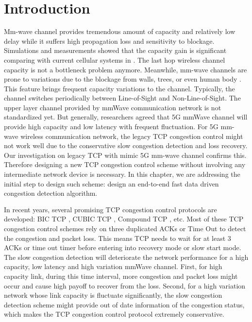 \section{Introduction}
\par  Mm-wave channel provides tremendous amount of capacity and relatively low delay while it suffers high propagation loss and sensitivity to blockage. Simulations and measurements showed that the capacity gain is significant comparing with current cellular systems in \cite{akdeniz2014millimeter,bai2015coverage}. The last hop wireless channel capacity is not a bottleneck problem anymore. Meanwhile, mm-wave channels are prone to variations due to the blockage from walls, trees, or even human body \cite{lu2012modeling, zhao201328, alejos2008measurement}. This feature brings frequent capacity variations to the channel. Typically, the channel switches periodically between Line-of-Sight and Non-Line-of-Sight. The upper layer channel provided by mmWave communication network is not standardized yet. But generally, researchers agreed that 5G mmWave channel will provide high capacity and low latency with frequent fluctuation. For 5G mm-wave wireless communication network, the legacy TCP congestion control might not work well due to the conservative slow congestion detection and loss recovery. Our investigation on legacy TCP with mimic 5G mm-wave channel confirms this. Therefore designing a new TCP congestion control scheme without involving any intermediate network device is necessary. In this chapter, we are addressing the initial step to design such scheme: design an end-to-end fast data driven congestion detection algorithm.
\par In recent years, several promising TCP congestion control protocols are developed: BIC TCP \cite{xu2004binary}, CUBIC TCP \cite{ha2008cubic}, Compound TCP \cite{tan2006compound}, etc. Most of these TCP congestion control schemes rely on three duplicated ACKs or Time Out to detect the congestion and packet loss. This means TCP needs to wait for at least 3 ACKs or time out timer before entering into recovery mode or slow start mode. The slow congestion detection will deteriorate the network performance for a high capacity, low latency and high variation mmWave channel. First, for high capacity link, during this time interval, more congestion and packet loss might occur and cause high payoff to recover from the loss. Second, for a high variation network whose link capacity is fluctuate significantly, the slow congestion detection scheme might provide out of date information of the congestion status, which makes the TCP congestion control protocol extremely conservative.
